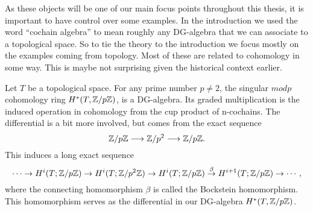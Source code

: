 

As these objects will be one of our main focus points throughout this thesis, it is important to have control over some examples. In the introduction we used the word ``cochain algebra'' to mean roughly any DG-algebra that we can associate to a topological space. So to tie the theory to the introduction we focus mostly on the examples coming from topology. Most of these are related to cohomology in some way. This is maybe not surprising given the historical context earlier. 

\begin{example}
\label{ex:singular_p_cohomology}
Let $T$ be a topological space. For any prime number $p\neq 2$, the singular $mod p$ cohomology ring $H^*(T, \mathbb{Z}/p\mathbb{Z})$, is a DG-algebra. Its graded multiplication is the induced operation in cohomology from the cup product of n-cochains. The differential is a bit more involved, but comes from the exact sequence
\begin{equation*}
\mathbb{Z}/p\mathbb{Z} \longrightarrow \mathbb{Z}/p^2 \longrightarrow \mathbb{Z}/p\mathbb{Z}.
\end{equation*}    
This induces a long exact sequence 
\begin{equation*}
    \cdots \rightarrow H^i(T; \mathbb{Z}/p\mathbb{Z}) \rightarrow H^i(T; \mathbb{Z}/p^2\mathbb{Z}) \rightarrow H^i(T; \mathbb{Z}/p\mathbb{Z}) \overset{\beta}\rightarrow H^{i+1}(T; \mathbb{Z}/p\mathbb{Z}) \rightarrow \cdots, 
\end{equation*}
where the connecting homomorphism $\beta$ is called the Bockstein homomorphism. This homomorphism serves as the differential in our DG-algebra $H^*(T, \mathbb{Z}/p\mathbb{Z})$. 
\end{example}

